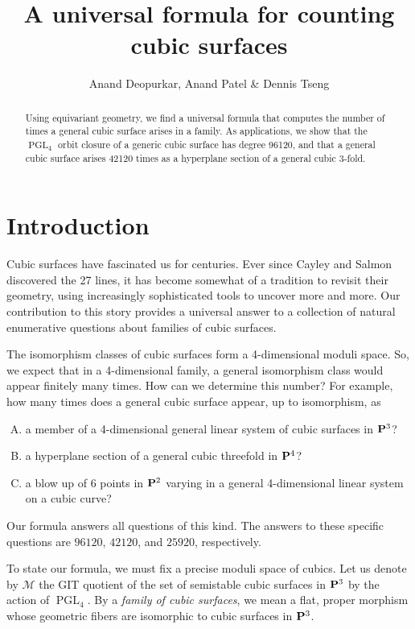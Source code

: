 \documentclass[reqno]{amsart}
\title{A universal formula for counting cubic surfaces}
\author{Anand Deopurkar, Anand Patel
  \& Dennis Tseng}
\renewcommand {\P}{{\bf P}}
\providecommand{\PGL}{\operatorname{PGL}}
\numberwithin{equation}{section}
\begin{document}
\maketitle

\begin{abstract}
  Using equivariant geometry, we find a universal formula that computes the number of times a general cubic surface arises in a family.
  As applications, we show that the $\PGL_4$ orbit closure of a generic cubic surface has degree 96120, and that a general cubic surface arises 42120 times as a hyperplane section of a general cubic 3-fold.
\end{abstract}




\section{Introduction}
\label{sec:intro}

Cubic surfaces have fascinated us for centuries. Ever since Cayley and
Salmon discovered the 27 lines, it has become somewhat of a tradition
to revisit their geometry, using increasingly sophisticated tools to
uncover more and more. Our contribution to this story provides a
universal answer to a collection of natural enumerative questions
about families of cubic surfaces.

The isomorphism classes of cubic surfaces form a 4-dimensional moduli
space. So, we expect that in a 4-dimensional family, a general
isomorphism class would appear finitely many times. How can we
determine this number? For example, how many times does a general
cubic surface appear, up to isomorphism, as
\begin{enumerate}[(A)]
\item \label{orbit} a member of a 4-dimensional general linear system of cubic surfaces in $\P^3$?
\item \label{slice} a hyperplane section of a general cubic threefold in $\P^4$?
\item a blow up of 6 points in $\P^2$ varying in a general
  4-dimensional linear system on a cubic curve?
\end{enumerate}
Our formula answers all questions of this kind.  The answers to these
specific questions are $96120$, $42120$, and $25920$, respectively.

To state our formula, we must fix a precise moduli space of cubics.
Let us denote by $\mathcal{M}$ the GIT quotient of the set of
semistable cubic surfaces in $\P^3$ by the action of $\PGL_4$.  By a
\emph{family of cubic surfaces}, we mean a flat, proper morphism whose
geometric fibers are isomorphic to cubic surfaces in $\P^3$.
\end{document}
